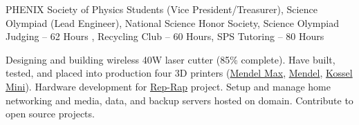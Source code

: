 \documentclass[10pt,letterpaper]{article}
\begin{document}
\spacedhrule{0.2em}{-0.4em}

	{PHENIX Society of Physics Students (Vice President/Treasurer), Science Olympiad (Lead Engineer), National Science Honor Society, Science Olympiad Judging -- 62 Hours , Recycling Club -- 60 Hours, SPS Tutoring -- 80 Hours}

\spacedhrule{0.2em}{-0.4em}

{Designing and building wireless 40W laser cutter (85\% complete). Have built, tested, and placed into production four 3D printers (\href{http://reprap.org/wiki/MendelMax}{Mendel Max}, \href{http://reprap.org/wiki/Mendel}{Mendel}, \href{http://reprap.org/wiki/Kossel}{Kossel Mini}). Hardware development for \href{http://reprap.org/wiki/RepRap}{Rep-Rap} project. Setup and manage home networking and media, data, and backup servers hosted on domain. Contribute to open source projects.}

\end{document}
